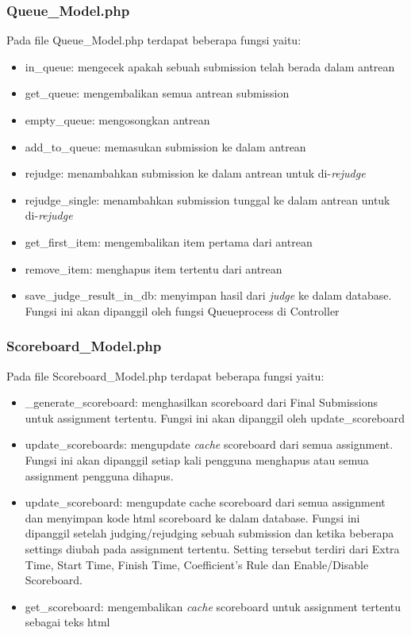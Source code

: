 \subsubsection{Queue\_Model.php}
Pada file Queue\_Model.php terdapat beberapa fungsi yaitu:
\begin{itemize}
	\item in\_queue: mengecek apakah sebuah submission telah berada dalam antrean
	\item get\_queue: mengembalikan semua antrean submission
	\item empty\_queue: mengosongkan antrean
	\item add\_to\_queue: memasukan submission ke dalam antrean
	\item rejudge: menambahkan submission ke dalam antrean untuk di-\textit{rejudge}
	\item rejudge\_single: menambahkan submission tunggal ke dalam antrean untuk di-\textit{rejudge}
	\item get\_first\_item: mengembalikan item pertama dari antrean
	\item remove\_item: menghapus item tertentu dari antrean
	\item save\_judge\_result\_in\_db: menyimpan hasil dari \textit{judge} ke dalam database. Fungsi ini akan dipanggil oleh fungsi Queueprocess di Controller
\end{itemize}

\subsubsection{Scoreboard\_Model.php}
Pada file Scoreboard\_Model.php terdapat beberapa fungsi yaitu:
\begin{itemize}
	\item \_generate\_scoreboard: menghasilkan scoreboard dari Final Submissions untuk assignment tertentu. Fungsi ini akan dipanggil oleh update\_scoreboard
	\item update\_scoreboards: mengupdate \textit{cache} scoreboard dari semua assignment. Fungsi ini akan dipanggil setiap kali pengguna menghapus atau semua assignment pengguna dihapus.
	\item update\_scoreboard: mengupdate cache scoreboard dari semua assignment dan menyimpan kode html scoreboard ke dalam database. Fungsi ini dipanggil setelah judging/rejudging sebuah submission dan ketika beberapa settings diubah pada assignment tertentu. Setting tersebut terdiri dari Extra Time, Start Time, Finish Time, Coefficient's Rule dan Enable/Disable Scoreboard.
	\item get\_scoreboard: mengembalikan \textit{cache} scoreboard untuk assignment tertentu sebagai teks html
\end{itemize}

